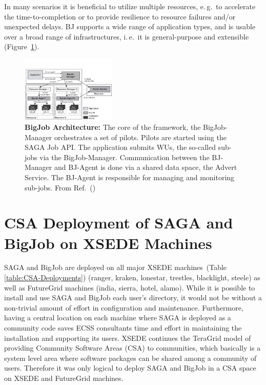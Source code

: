 \documentclass{sig-alternate}
\begin{document}
In many scenarios it is beneficial to utilize multiple resources,
e.\,g.\ to accelerate the time-to-completion or to provide resilience
to resource failures and/or unexpected delays.  BJ supports a wide
range of application types, and is usable over a broad range of
infrastructures, i.\,e.\ it is general-purpose and extensible
(Figure~\ref{fig:figures_re_bigjob_interactions}). 


\begin{figure}[t]
  \centering
  \includegraphics[width=0.40\textwidth]{./figs/re_bigjob_interactions}
   \caption{\textbf{BigJob Architecture:} The core of the framework,
     the BigJob-Manager orchestrates a set of pilots. Pilots are
     started using the SAGA Job API. The application submits WUs, the
     so-called sub-jobs via the BigJob-Manager. Communication between
     the BJ-Manager and BJ-Agent is done via a shared data space, the
     Advert Service. The BJ-Agent is responsible for managing and
     monitoring sub-jobs. From Ref.~(\cite{saga_bigjob_condor_cloud})}
        \label{fig:figures_re_bigjob_interactions}
\end{figure}



\section{CSA Deployment of SAGA and BigJob on XSEDE Machines}
 \label{ssec:csa}
 
SAGA and BigJob are deployed on all major XSEDE
machines~(Table \ref{table:CSA-Deployments}) (ranger,
kraken, lonestar, trestles, blacklight, steele) as well as FutureGrid machines
(india, sierra, hotel, alamo). While it is possible to install and
use SAGA and BigJob each user's directory, it would not be without a non-trivial
amount of effort in configuration and maintenance. Furthermore, having a
central location on each machine where SAGA is deployed as a community code
saves ECSS consultants time and effort in maintaining the installation and
supporting its users. XSEDE continues the TeraGrid model of providing Community
Software Areas (CSA) to communities, which basically is a system
level area where software packages can be shared among a community of users.
Therefore it was only logical to deploy SAGA and BigJob in a CSA space on XSEDE
and FutureGrid machines.
\end{document}
